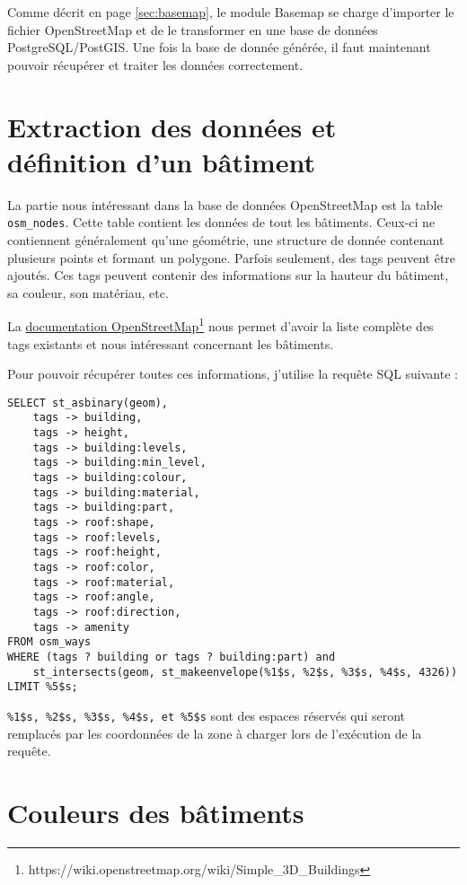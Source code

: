 Comme décrit en page \pageref{sec:basemap} \autoref{sec:basemap}, le module Basemap se charge d'importer le fichier OpenStreetMap et de le transformer en une base de données PostgreSQL/PostGIS. Une fois la base de donnée générée, il faut maintenant pouvoir récupérer et traiter les données correctement.

\newpage

\section{Extraction des données et définition d'un bâtiment}
\label{sec:extraction}

La partie nous intéressant dans la base de données OpenStreetMap est la table \texttt{osm\_nodes}. Cette table contient les données de tout les bâtiments. Ceux-ci ne contiennent généralement qu'une \Gls{géométrie}, une structure de donnée contenant plusieurs points et formant un polygone. Parfois seulement, des \Gls{tags} peuvent être ajoutés. Ces tags peuvent contenir des informations sur la hauteur du bâtiment, sa couleur, son matériau, etc.

La \href{https://wiki.openstreetmap.org/wiki/Simple_3D_Buildings}{documentation OpenStreetMap}\footnote{https://wiki.openstreetmap.org/wiki/Simple\_3D\_Buildings} nous permet d'avoir la liste complète des tags existants et nous intéressant concernant les bâtiments.

Pour pouvoir récupérer toutes ces informations, j'utilise la requête SQL suivante :

\begin{verbatim}
SELECT st_asbinary(geom),
    tags -> building,
    tags -> height,
    tags -> building:levels,
    tags -> building:min_level,
    tags -> building:colour,
    tags -> building:material,
    tags -> building:part,
    tags -> roof:shape,
    tags -> roof:levels,
    tags -> roof:height,
    tags -> roof:color,
    tags -> roof:material,
    tags -> roof:angle,
    tags -> roof:direction,
    tags -> amenity
FROM osm_ways
WHERE (tags ? building or tags ? building:part) and
    st_intersects(geom, st_makeenvelope(%1$s, %2$s, %3$s, %4$s, 4326))
LIMIT %5$s;
\end{verbatim}

\texttt{\%1\$s, \%2\$s, \%3\$s, \%4\$s, et \%5\$s} sont des espaces réservés qui seront remplacés par les coordonnées de la zone à charger lors de l'exécution de la requête.

\newpage

\section{Couleurs des bâtiments}

